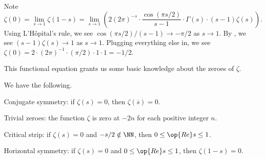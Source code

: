 \documentclass[../notes.tex]{subfiles}
\begin{document}
\begin{example} \label{ex:zeta-zero}
	Note
	\[\zeta(0)=\lim_{s\to1}\zeta(1-s)=\lim_{s\to1}\left(2(2\pi)^{-s}\cdot\frac{\cos(\pi s/2)}{s-1}\cdot\Gamma(s)\cdot(s-1)\zeta(s)\right).\]
	Using L'H\^opital's rule, we see $\cos(\pi s/2)/(s-1)\to-\pi/2$ as $s\to1$. By , we see $(s-1)\zeta(s)\to1$ as $s\to1$. Plugging everything else in, we see $\zeta(0)=2\cdot(2\pi)^{-1}\cdot(\pi/2)\cdot1\cdot1=-1/2$.
\end{example}
This functional equation grants us some basic knowledge about the zeroes of $\zeta$.
\begin{corollary}
	We have the following.
	\begin{listalph}
		\item Conjugate symmetry: if $\zeta(s)=0$, then $\zeta(\overline s)=0$.
		\item Trivial zeroes: the function $\zeta$ is zero at $-2n$ for each positive integer $n$.
		\item Critical strip: if $\zeta(s)=0$ and $-s/2\notin\NN$, then $0\le\op{Re}s\le1$.
		\item Horizontal symmetry: if $\zeta(s)=0$ and $0\le\op{Re}s\le1$, then $\zeta(1-s)=0$.
	\end{listalph}
\end{corollary}
\end{document}
